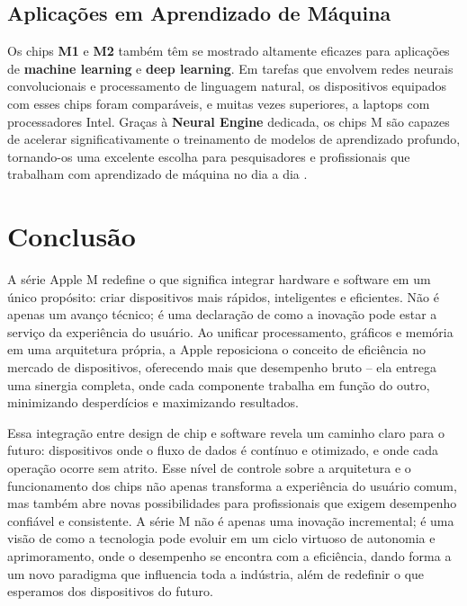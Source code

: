 \documentclass[a4paper,times,12pt]{article}
\begin{document}
\subsection{Aplicações em Aprendizado de Máquina}
\hspace{+15pt}
Os chips \textbf{M1} e \textbf{M2} também têm se mostrado altamente eficazes para aplicações de \textbf{machine learning} e \textbf{deep learning}. Em tarefas que envolvem redes neurais convolucionais e processamento de linguagem natural, os dispositivos equipados com esses chips foram comparáveis, e muitas vezes superiores, a laptops com processadores Intel. Graças à \textbf{Neural Engine} dedicada, os chips M são capazes de acelerar significativamente o treinamento de modelos de aprendizado profundo, tornando-os uma excelente escolha para pesquisadores e profissionais que trabalham com aprendizado de máquina no dia a dia \cite{usability_ml, apple_silicon_potential}.

\section{Conclusão}
\hspace{+15pt}
A série Apple M redefine o que significa integrar hardware e software em um único propósito: criar dispositivos mais rápidos, inteligentes e eficientes. Não é apenas um avanço técnico; é uma declaração de como a inovação pode estar a serviço da experiência do usuário. Ao unificar processamento, gráficos e memória em uma arquitetura própria, a Apple reposiciona o conceito de eficiência no mercado de dispositivos, oferecendo mais que desempenho bruto – ela entrega uma sinergia completa, onde cada componente trabalha em função do outro, minimizando desperdícios e maximizando resultados.

Essa integração entre design de chip e software revela um caminho claro para o futuro: dispositivos onde o fluxo de dados é contínuo e otimizado, e onde cada operação ocorre sem atrito. Esse nível de controle sobre a arquitetura e o funcionamento dos chips não apenas transforma a experiência do usuário comum, mas também abre novas possibilidades para profissionais que exigem desempenho confiável e consistente. A série M não é apenas uma inovação incremental; é uma visão de como a tecnologia pode evoluir em um ciclo virtuoso de autonomia e aprimoramento, onde o desempenho se encontra com a eficiência, dando forma a um novo paradigma que influencia toda a indústria, além de redefinir o que esperamos dos dispositivos do futuro.
\end{document}
